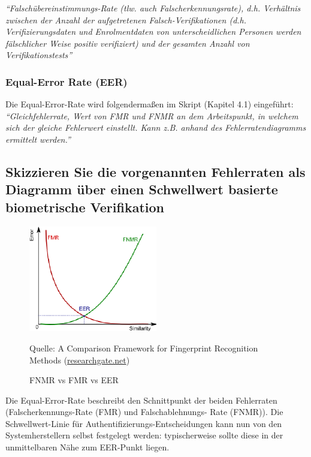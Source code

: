 \documentclass{article}
\newcommand{\figuresource}[1]{
	\begin{center}Quelle: {#1}\end{center}
}
\begin{document}
\textit{
``Falschübereinstimmungs-Rate (tlw. auch Falscherkennungsrate), d.h. Verhältnis zwischen der Anzahl der aufgetretenen Falsch-Verifikationen (d.h. Verifizierungsdaten und Enrolmentdaten von unterscheidlichen Personen werden fälschlicher Weise positiv verifiziert) und der gesamten Anzahl von Verifikationstests''
}

\subsubsection{Equal-Error Rate (EER)}

Die Equal-Error-Rate wird folgendermaßen im Skript (Kapitel 4.1) eingeführt:\\[0.1em]

\textit{
``Gleichfehlerrate, Wert von FMR und FNMR an dem Arbeitspunkt, in welchem sich der gleiche Fehlerwert einstellt. Kann z.B. anhand des Fehlerratendiagramms ermittelt werden.''
}

\newpage

\subsection{Skizzieren Sie die vorgenannten Fehlerraten als Diagramm \"uber einen Schwellwert basierte biometrische Verifikation}

\begin{figure}[ht]
	\includegraphics[width=0.5\textwidth]{assets/fnmr-fmr-eer}
	\centering
	\caption{FNMR vs FMR vs EER}
	\figuresource{A Comparison Framework for Fingerprint Recognition Methods
		(\href{https://www.researchgate.net/figure/The-Relationship-between-FNMR-FMR-and-ERR_fig3_259558386}{researchgate.net})
	}
\end{figure}

Die Equal-Error-Rate beschreibt den Schnittpunkt der beiden Fehlerraten (Falscherkennungs-Rate (FMR) und Falschablehnungs-
Rate (FNMR)). Die Schwellwert-Linie für Authentifizierungs-Entscheidungen kann nun von den Systemherstellern selbst
festgelegt werden: typischerweise sollte diese in der unmittelbaren Nähe zum EER-Punkt liegen.
\end{document}
